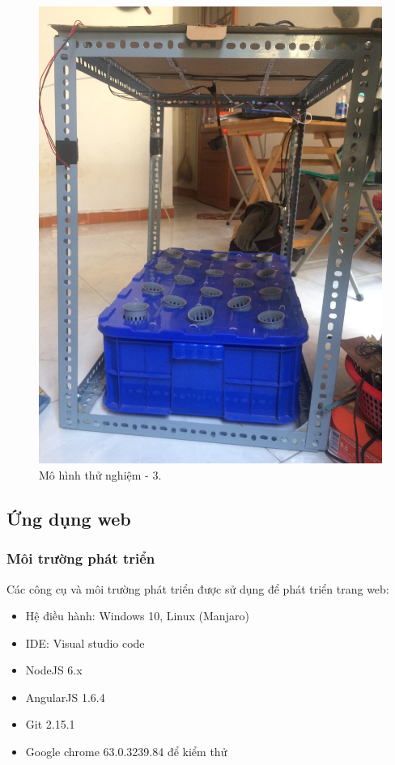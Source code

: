 \documentclass[a4paper,12pt,oneside]{article}
\begin{document}
\begin{enumerate}
			\begin{figure}[H]
			\centering
			\includegraphics[scale=.1]{hinh/mohinh_3.jpg}
			\caption{Mô hình thử nghiệm - 3.}
			\end{figure}
	\end{enumerate}

\newpage
\subsection{Ứng dụng web}
\subsubsection{Môi trường phát triển}
Các công cụ và môi trường phát triển được sử dụng để phát triển trang web:
\begin{itemize}
\item Hệ điều hành: Windows 10, Linux (Manjaro)
\item IDE: Visual studio code
\item NodeJS 6.x
\item AngularJS 1.6.4
\item Git 2.15.1
\item Google chrome 63.0.3239.84 để kiểm thử 
\end{itemize}
\end{document}
